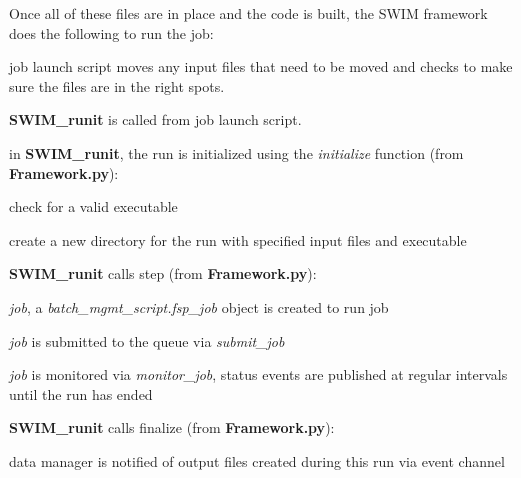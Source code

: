 Once all of these files are in place and the code is built, the SWIM framework does the following to run the job:
\begin{enumerator}
\item job launch script moves any input files that need to be moved and checks to make sure the files are in the right spots.
	\begin{enumerator}
	\item {\bf SWIM\_runit} is called from job launch script.
		\begin{enumerator}
		\item in {\bf SWIM\_runit}, the run is initialized using the {\em initialize} function (from {\bf Framework.py}):
			\begin{enumerator}
			\item check for a valid executable
			\item create a new directory for the run with specified input files and executable
			\end{enumerator}
		\item {\bf SWIM\_runit} calls step (from {\bf Framework.py}):
			\begin{enumerator}
			\item {\em job}, a {\em batch\_mgmt\_script.fsp\_job} object is created to run job
			\item {\em job} is submitted to the queue via {\em submit\_job}
			\item {\em job} is monitored via {\em monitor\_job}, status events are published at regular intervals until the run has ended
			\end{enumerator}
		\item {\bf SWIM\_runit} calls finalize (from {\bf Framework.py}):
			\begin{enumerator}
			\item data manager is notified of output files created during this run via event channel
			\end{enumerator}
		\end{enumerator}
	\end{enumerator}
\end{enumerator}


